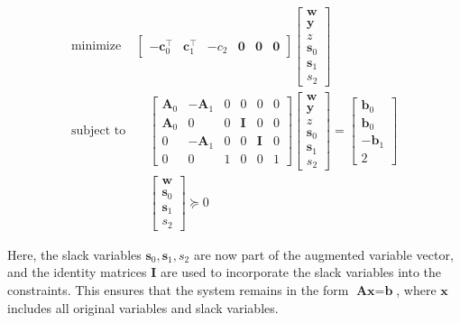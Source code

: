 \documentclass[11pt]{article}
\begin{document}
\begin{align}
    \text{minimize} & 
    \begin{bmatrix}
        -\textbf{c}_0^\top & \textbf{c}_1^\top & -c_2 & \textbf{0} & \textbf{0} & \textbf{0}
    \end{bmatrix}
    \begin{bmatrix}
        \textbf{w} \\ \textbf{y} \\ z \\ \textbf{s}_0 \\ \textbf{s}_1 \\ s_2
    \end{bmatrix}
     \\
    \text{subject to} & \quad 
    \begin{bmatrix}
        \textbf{A}_0 & -\textbf{A}_1 & 0 & 0 & 0 & 0 \\
        \textbf{A}_0 & 0 & 0 & \textbf{I} & 0 & 0 \\
        0 & -\textbf{A}_1 & 0 & 0 & \textbf{I} & 0 \\
        0 & 0 & 1 & 0 & 0 & 1
    \end{bmatrix}
    \begin{bmatrix}
        \textbf{w} \\ \textbf{y} \\ z \\ \textbf{s}_0 \\ \textbf{s}_1 \\ s_2
    \end{bmatrix}
    =
    \begin{bmatrix}
        \textbf{b}_0 \\ \textbf{b}_0 \\ -\textbf{b}_1 \\ 2
    \end{bmatrix}
    \\
    & \quad 
    \begin{bmatrix}
        \textbf{w} \\ \textbf{s}_0 \\ \textbf{s}_1 \\ s_2 
    \end{bmatrix}
    \succeq 0
\end{align}

Here, the slack variables \(\textbf{s}_0, \textbf{s}_1, s_2\) are now part of the augmented variable vector, and the identity matrices \(\textbf{I}\) are used to incorporate the slack variables into the constraints. This ensures that the system remains in the form \(\textbf{A} \textbf{x} = \textbf{b}\), where \(\textbf{x}\) includes all original variables and slack variables.
\end{document}
